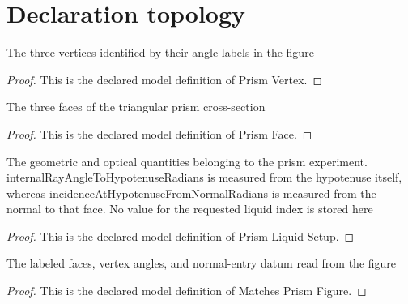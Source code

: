 \section{Declaration topology}
\begin{definition}
  \label{def:physics:phyx-mini-0100:phyxminiproblems-problemphyxmini0100-prismvertex}
  The three vertices identified by their angle labels in the figure
\end{definition}
\begin{proof}
  This is the declared model definition of Prism Vertex.
\end{proof}
\begin{definition}
  \label{def:physics:phyx-mini-0100:phyxminiproblems-problemphyxmini0100-prismface}
  The three faces of the triangular prism cross-section
\end{definition}
\begin{proof}
  This is the declared model definition of Prism Face.
\end{proof}
\begin{definition}
  \label{def:physics:phyx-mini-0100:phyxminiproblems-problemphyxmini0100-prismliquidsetup}
  The geometric and optical quantities belonging to the prism experiment. internalRayAngleToHypotenuseRadians is measured from the hypotenuse itself, whereas incidenceAtHypotenuseFromNormalRadians is measured from the normal to that face. No value for the requested liquid index is stored here
\end{definition}
\begin{proof}
  This is the declared model definition of Prism Liquid Setup.
\end{proof}
\begin{definition}
  \label{def:physics:phyx-mini-0100:phyxminiproblems-problemphyxmini0100-matchesprismfigure}
  The labeled faces, vertex angles, and normal-entry datum read from the figure
\end{definition}
\begin{proof}
  This is the declared model definition of Matches Prism Figure.
\end{proof}
